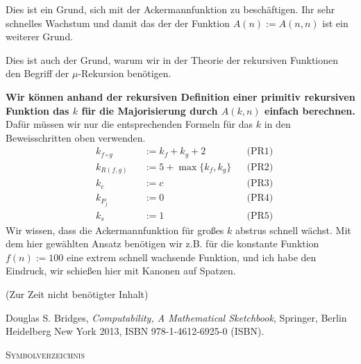 \documentclass[a4paper]{amsart}
\theoremstyle{definition}
\begin{document}
Dies ist ein Grund, sich mit der Ackermannfunktion zu beschäftigen. Ihr sehr schnelles Wachstum
und damit das der der Funktion $A(n) := A(n,n)$ ist ein weiterer Grund.

Dies ist auch der Grund, warum wir in der Theorie der rekursiven Funktionen den Begriff der
$\mu$-Rekursion benötigen.

\textbf{Wir können anhand der rekursiven Definition einer primitiv rekursiven Funktion das $k$ für
die Majorisierung durch $A(k,n)$ einfach berechnen.} Dafür müssen wir nur die entsprechenden 
Formeln für das $k$ in den Beweisschritten oben verwenden.
\begin{align*}
    &k_{f \circ g} &&:= k_f + k_g + 2           &&\text{(PR1)}\\
    &k_{R(f,g)}    &&:= 5 + \max \{ k_f, k_g \} &&\text{(PR2)}\\
    &k_c           &&:= c                       &&\text{(PR3)}\\
    &k_{P_j}       &&:= 0                       &&\text{(PR4)}\\
    &k_s           &&:= 1                       &&\text{(PR5)}
\end{align*}
Wir wissen, dass die Ackermannfunktion für großes $k$ abstrus schnell wächst. Mit dem hier gewählten
Ansatz benötigen wir z.B. für die konstante Funktion $f(n) := 100$ eine extrem schnell wachsende 
Funktion, und ich habe den Eindruck, wir schießen hier mit Kanonen auf Spatzen.


\begin{backup}
    (Zur Zeit nicht benötigter Inhalt)
\end{backup}

\begin{thebibliography}{9}

      Douglas S. Bridges, \emph{Computability, A Mathematical Sketchbook},
      Springer, Berlin Heidelberg New York 2013, ISBN 978-1-4612-6925-0 (ISBN).

\end{thebibliography}

\begin{large}
    \centerline{\textsc{Symbolverzeichnis}}
\end{large}
\bigskip
\end{document}
